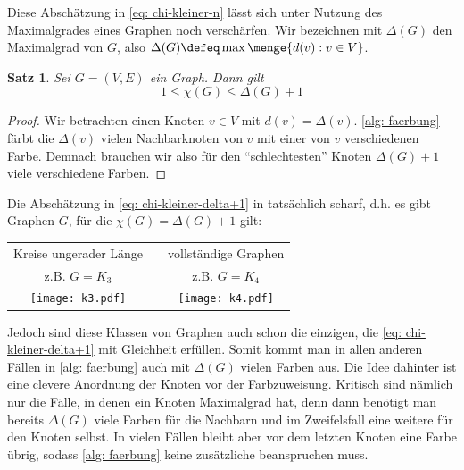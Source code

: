 \documentclass[ngerman, a4paper, 12pt]{article}
\newcounter{themcount}
\theoremstyle{plain}
\newtheorem{satz}[themcount]{Satz}
\theoremstyle{break}
\theoremstyle{proofstyle}
\newtheorem{proof}{Beweis}
\begin{document}
	Diese Abschätzung in \cref{eq: chi-kleiner-n} lässt sich unter Nutzung des Maximalgrades eines Graphen noch verschärfen. Wir bezeichnen mit $\Delta(G)$ den Maximalgrad von $G$, also $\Delta(G) \defeq \max\menge{d(v) : v \in V}$.
	
	\begin{satz}
		Sei $G = (V,E)$ ein Graph. Dann gilt
		\begin{equation}
			1 \le \chi(G) \le \Delta(G) + 1
			\label{eq: chi-kleiner-delta+1}
		\end{equation}
	\end{satz}
	\begin{proof}
		Wir betrachten einen Knoten $v \in V$ mit $d(v) = \Delta(v)$. \cref{alg: faerbung} färbt die $\Delta(v)$ vielen Nachbarknoten von $v$ mit einer von $v$ verschiedenen Farbe. Demnach brauchen wir also für den \enquote{schlechtesten} Knoten $\Delta(G) + 1$ viele verschiedene Farben.
	\end{proof}
	
	Die Abschätzung in \cref{eq: chi-kleiner-delta+1} in tatsächlich scharf, d.h. es gibt Graphen $G$, für die $\chi(G) = \Delta(G) + 1$ gilt:
	\begin{center}
		\begin{tabular}{ccc}
			Kreise ungerader Länge && vollständige Graphen \\
			z.B. $G = K_3$ & & z.B. $G = K_4$ \\
			\texttt{[image: k3.pdf]} 
			& \hspace{3em} &
			\texttt{[image: k4.pdf]}
		\end{tabular}
	\end{center}
	
	Jedoch sind diese Klassen von Graphen auch schon die einzigen, die \cref{eq: chi-kleiner-delta+1} mit Gleichheit erfüllen.
	Somit kommt man in allen anderen Fällen in \cref{alg: faerbung} auch mit $\Delta(G)$ vielen Farben aus.
	Die Idee dahinter ist eine clevere Anordnung der Knoten vor der Farbzuweisung. Kritisch sind nämlich nur die Fälle, in denen ein Knoten Maximalgrad hat, denn dann benötigt man bereits $\Delta(G)$ viele Farben für die Nachbarn und im Zweifelsfall eine weitere für den Knoten selbst. In vielen Fällen bleibt aber vor dem letzten Knoten eine Farbe übrig, sodass \cref{alg: faerbung} keine zusätzliche beanspruchen muss.
 	
\end{document}
